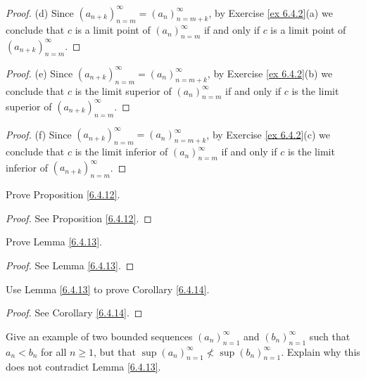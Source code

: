 \begin{proof}{(d)}
Since \((a_{n + k})_{n = m}^\infty = (a_n)_{n = m + k}^\infty\), by Exercise \ref{ex 6.4.2}(a) we conclude that \(c\) is a limit point of \((a_n)_{n = m}^\infty\) if and only if \(c\) is a limit point of \((a_{n + k})_{n = m}^\infty\).
\end{proof}

\begin{proof}{(e)}
Since \((a_{n + k})_{n = m}^\infty = (a_n)_{n = m + k}^\infty\), by Exercise \ref{ex 6.4.2}(b) we conclude that \(c\) is the limit superior of \((a_n)_{n = m}^\infty\) if and only if \(c\) is the limit superior of \((a_{n + k})_{n = m}^\infty\).
\end{proof}

\begin{proof}{(f)}
Since \((a_{n + k})_{n = m}^\infty = (a_n)_{n = m + k}^\infty\), by Exercise \ref{ex 6.4.2}(c) we conclude that \(c\) is the limit inferior of \((a_n)_{n = m}^\infty\) if and only if \(c\) is the limit inferior of \((a_{n + k})_{n = m}^\infty\).
\end{proof}

\begin{exercise}\label{ex 6.4.3}
Prove Proposition \ref{6.4.12}.
\end{exercise}

\begin{proof}
See Proposition \ref{6.4.12}.
\end{proof}

\begin{exercise}\label{ex 6.4.4}
Prove Lemma \ref{6.4.13}.
\end{exercise}

\begin{proof}
See Lemma \ref{6.4.13}.
\end{proof}

\begin{exercise}\label{ex 6.4.5}
Use Lemma \ref{6.4.13} to prove Corollary \ref{6.4.14}.
\end{exercise}

\begin{proof}
See Corollary \ref{6.4.14}.
\end{proof}

\begin{exercise}\label{ex 6.4.6}
Give an example of two bounded sequences \((a_n)_{n = 1}^\infty\) and \((b_n)_{n = 1}^\infty\) such that \(a_n < b_n\) for all \(n \geq 1\), but that \(\sup(a_n)_{n = 1}^\infty \not< \sup(b_n)_{n = 1}^\infty\).
Explain why this does not contradict Lemma \ref{6.4.13}.
\end{exercise}

